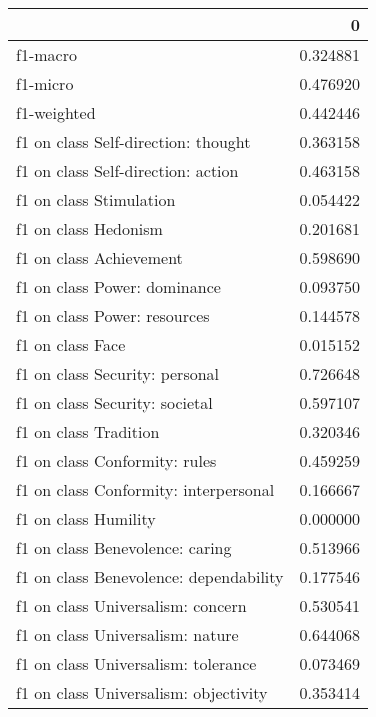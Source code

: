 \begin{tabular}{lr}
\toprule
{} &         0 \\
\midrule
f1-macro                               &  0.324881 \\
f1-micro                               &  0.476920 \\
f1-weighted                            &  0.442446 \\
f1 on class Self-direction: thought    &  0.363158 \\
f1 on class Self-direction: action     &  0.463158 \\
f1 on class Stimulation                &  0.054422 \\
f1 on class Hedonism                   &  0.201681 \\
f1 on class Achievement                &  0.598690 \\
f1 on class Power: dominance           &  0.093750 \\
f1 on class Power: resources           &  0.144578 \\
f1 on class Face                       &  0.015152 \\
f1 on class Security: personal         &  0.726648 \\
f1 on class Security: societal         &  0.597107 \\
f1 on class Tradition                  &  0.320346 \\
f1 on class Conformity: rules          &  0.459259 \\
f1 on class Conformity: interpersonal  &  0.166667 \\
f1 on class Humility                   &  0.000000 \\
f1 on class Benevolence: caring        &  0.513966 \\
f1 on class Benevolence: dependability &  0.177546 \\
f1 on class Universalism: concern      &  0.530541 \\
f1 on class Universalism: nature       &  0.644068 \\
f1 on class Universalism: tolerance    &  0.073469 \\
f1 on class Universalism: objectivity  &  0.353414 \\
\bottomrule
\end{tabular}
